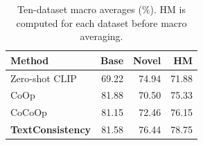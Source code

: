 \begin{table}[t]
\centering
\caption{Ten-dataset macro averages (\%). HM is computed for each dataset before macro averaging.}
\label{tab:average_metrics}
\small
\begin{tabular}{lrrr}
\toprule
Method & Base & Novel & HM \\
\midrule
Zero-shot CLIP & 69.22 & 74.94 & 71.88 \\
CoOp & 81.88 & 70.50 & 75.33 \\
CoCoOp & 81.15 & 72.46 & 76.15 \\
\textbf{TextConsistency} & 81.58 & 76.44 & 78.75 \\
\bottomrule
\end{tabular}
\end{table}

